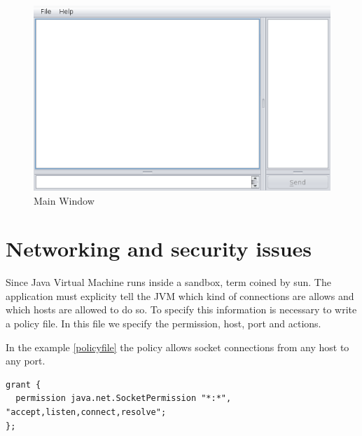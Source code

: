 \documentclass[8pt,a4paper]{article}
\begin{document}
\begin{figure} [H]
    \centering
    \includegraphics[scale=0.3]{img/mainscreen}
    \caption{Main Window} 
    \label{fig:papinho1}
\end{figure}

\section{Networking and security issues}

Since Java Virtual Machine runs inside a sandbox, term coined by sun. The application must explicity tell the JVM which kind of connections are allows and which hosts are allowed to do so.
To specify this information is necessary to write a policy file. In this file we specify the permission, host, port and actions. 

In the example \ref{policyfile} the policy allows socket connections from any host to any port. 


\begin{lstlisting}[caption={Policy file},label=policyfile]
grant {
  permission java.net.SocketPermission "*:*", "accept,listen,connect,resolve";
};
\end{lstlisting}
\end{document}
